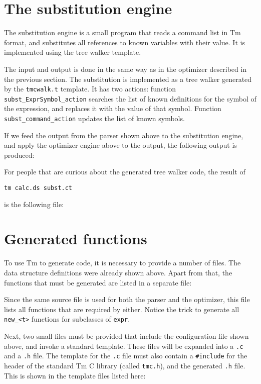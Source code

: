 \section{The substitution engine}
The substitution engine is a small program that reads a command list
in Tm format, and substitutes all references to known variables with
their value.
It is implemented using the tree walker template.
\begin{showfile}

\end{showfile}
The input and output is done in the same way as in the optimizer 
described in the previous section. The substitution is implemented as
a tree walker generated by the \verb'tmcwalk.t' template. It has
two actions: function \verb'subst_ExprSymbol_action' searches the list
of known definitions for the symbol of the expression, and replaces
it with the value of that symbol. Function \verb'subst_command_action'
updates the list of known symbols.
\par
If we feed the output from the parser shown above to the substitution
engine, and apply the optimizer engine above to the output, the following
output is produced:
\begin{showfile}
\end{showfile}
\par
For people that are curious about the generated tree walker code, 
the result of
\begin{verbatim}
tm calc.ds subst.ct
\end{verbatim}
is the following file:
\begin{showfile}
\end{showfile}
\section{Generated functions}
To use Tm to generate code, it is necessary to provide a
number of files. The data structure definitions were already shown above.
Apart from that, the functions that must be generated are listed in a
separate file:
\begin{showfile}
\end{showfile}
Since the same source file is used for both the parser and the
optimizer, this file lists all functions that are required by either.
Notice the trick to generate all \verb'new_<t>' functions for subclasses
of {\tt expr}.

Next, two small files must be provided that include the configuration
file shown above, and invoke a standard template. These files will be
expanded into a \verb'.c' and a \verb'.h' file. The template for the
\verb'.c' file must also contain a \verb'#include' for the header of the
standard Tm C library (called \verb'tmc.h'), and the generated \verb'.h'
file. This is shown in the template files listed here:


